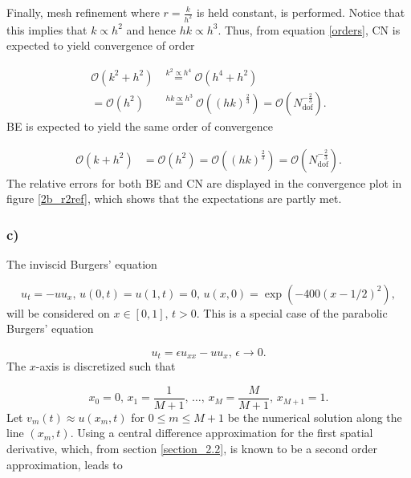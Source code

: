Finally, mesh refinement where $r = \frac{k}{h^2}$ is held constant, is performed. Notice that this implies that $k \propto h^2$ and hence $hk \propto h^3$. Thus, from equation \eqref{orders}, CN is expected to yield convergence of order

\begin{equation*}
    \begin{split}
        \mathcal{O}(k^2 + h^2) &\overset{k^2 \propto h^4}= \mathcal{O}(h^4 + h^2) \\ 
        = \mathcal{O}(h^2) &\overset{hk \propto h^3}= \mathcal{O}((hk)^{\frac{2}{3}}) = \mathcal{O}(N_{\mathrm{dof}}^{-\frac{2}{3}}).
    \end{split}
\end{equation*}
BE is expected to yield the same order of convergence

\begin{equation*}
    \begin{split}
        \mathcal{O}(k + h^2) &= \mathcal{O}(h^2) = \mathcal{O}((hk)^{\frac{2}{3}}) = \mathcal{O}(N_{\mathrm{dof}}^{-\frac{2}{3}}).
    \end{split}
\end{equation*}
The relative errors for both BE and CN are displayed in the convergence plot in figure \ref{2b_r2ref}, which shows that the expectations are partly met.

\newpage
\subsubsection{c)}
The inviscid Burgers' equation

\begin{equation}
    u_t = -uu_x, \, u(0,t) = u(1,t) = 0, \, u(x,0) = \exp{(-400(x-1/2)^2)},
\label{2c.burger}
\end{equation}
will be considered on $x \in [0,1], \, t > 0$. This is a special case of the parabolic Burgers' equation

\begin{equation*}
    u_t = \epsilon u_{xx} - uu_x, \, \epsilon \rightarrow 0.
\end{equation*}
The $x$-axis is discretized such that

\begin{equation*}
    x_0 = 0, \, x_1 = \frac{1}{M+1}, \, \dots, \, x_M = \frac{M}{M+1}, \, x_{M+1} = 1.
\end{equation*}
Let $v_m(t) \approx u(x_m,t)$ for $0 \leq m \leq M+1$ be the numerical solution along the line $(x_m,t)$. Using a central difference approximation for the first spatial derivative, which, from section \ref{section_2.2}, is known to be a second order approximation, leads to 

